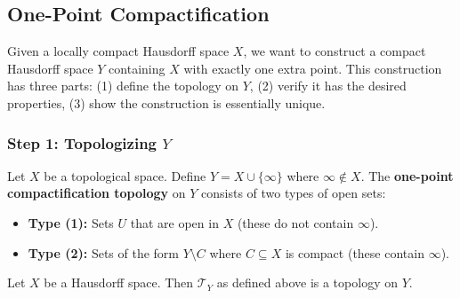 \documentclass[11pt]{report}
\begin{document}
\subsection{One-Point Compactification}

\begin{rembox}[Goal]
Given a locally compact Hausdorff space $X$, we want to construct a compact Hausdorff space $Y$ containing $X$ with exactly one extra point. This construction has three parts: (1) define the topology on $Y$, (2) verify it has the desired properties, (3) show the construction is essentially unique.
\end{rembox}

\subsubsection*{Step 1: Topologizing $Y$}

\begin{defbox}
Let $X$ be a topological space. Define $Y = X \cup \{\infty\}$ where $\infty \notin X$. The \textbf{one-point compactification topology} on $Y$ consists of two types of open sets:
\begin{itemize}[nosep]
    \item \textbf{Type (1):} Sets $U$ that are open in $X$ (these do not contain $\infty$).
    \item \textbf{Type (2):} Sets of the form $Y \setminus C$ where $C \subseteq X$ is compact (these contain $\infty$).
\end{itemize}
\end{defbox}

\begin{propbox}
Let $X$ be a Hausdorff space. Then $\mathcal{T}_Y$ as defined above is a topology on $Y$.
\end{propbox}
\end{document}
